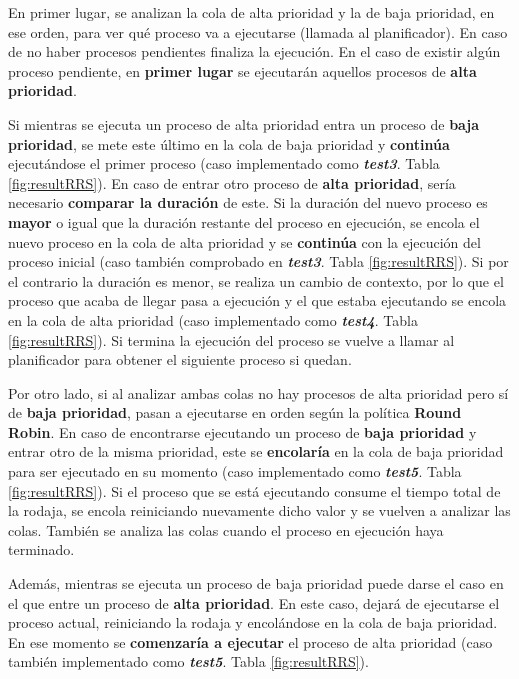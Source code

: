 \documentclass[10pt, spanish, pdftex]{template/UC3M_document}
\begin{document}
En primer lugar, se analizan la cola de alta prioridad y la de baja prioridad, en ese orden, para ver qué proceso va a ejecutarse (llamada al planificador). En caso de no haber procesos pendientes finaliza la ejecución. En el caso de existir algún proceso pendiente, en \textbf{primer lugar} se ejecutarán aquellos procesos de \textbf{alta prioridad}. 

Si mientras se ejecuta un proceso de alta prioridad entra un proceso de \textbf{baja prioridad}, se mete este último en la cola de baja prioridad y \textbf{continúa} ejecutándose el primer proceso (caso implementado como \textbf{\textit{test3}}. Tabla \ref{fig:resultRRS}). En caso de entrar otro proceso de \textbf{alta prioridad}, sería necesario \textbf{comparar la duración} de este. Si la duración del nuevo proceso es \textbf{mayor} o igual que la duración restante del proceso en ejecución, se encola el nuevo proceso en la cola de alta prioridad y se \textbf{continúa} con la ejecución del proceso inicial (caso también comprobado en \textbf{\textit{test3}}. Tabla \ref{fig:resultRRS}). Si por el contrario la duración es menor, se realiza un cambio de contexto, por lo que el proceso que acaba de llegar pasa a ejecución y el que estaba ejecutando se encola en la cola de alta prioridad (caso implementado como \textbf{\textit{test4}}. Tabla \ref{fig:resultRRS}). Si termina la ejecución del proceso se vuelve a llamar al planificador para obtener el siguiente proceso si quedan.

Por otro lado, si al analizar ambas colas no hay procesos de alta prioridad pero sí de \textbf{baja prioridad}, pasan a ejecutarse en orden según la política \textbf{Round Robin}. En caso de encontrarse ejecutando un proceso de \textbf{baja prioridad} y entrar otro de la misma prioridad, este se \textbf{encolaría} en la cola de baja prioridad para ser ejecutado en su momento (caso implementado como \textbf{\textit{test5}}. Tabla \ref{fig:resultRRS}). Si el proceso que se está ejecutando consume el tiempo total de la rodaja, se encola reiniciando nuevamente dicho valor y se vuelven a analizar las colas. También se analiza las colas cuando el proceso en ejecución haya terminado.

Además, mientras se ejecuta un proceso de baja prioridad puede darse el caso en el que entre un proceso de \textbf{alta prioridad}. En este caso, dejará de ejecutarse el proceso actual, reiniciando la rodaja y encolándose en la cola de baja prioridad. En ese momento se \textbf{comenzaría a ejecutar} el proceso de alta prioridad (caso también implementado como \textbf{\textit{test5}}. Tabla \ref{fig:resultRRS}).
\end{document}
